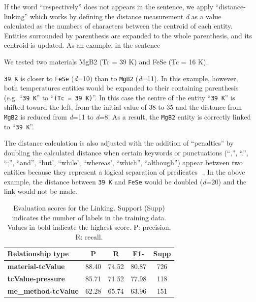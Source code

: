 
If the word ``respectively'' does not appears in the sentence, we apply ``distance-linking'' which works by defining the distance measurement \textit{d} as a value calculated as the numbers of characters between the centroid of each entity.
Entities surrounded by parenthesis are expanded to the whole parenthesis, and its centroid is updated.
As an example, in the sentence
\begin{displayquote}
    We tested two materials MgB2 (Tc = 39 K) and FeSe (Tc = 16 K).
\end{displayquote}

\texttt{39 K} is closer to \texttt{FeSe} (\textit{d}=10) than to \texttt{MgB2} (\textit{d}=11). 
In this example, however, both temperatures entities would be expanded to their containing parenthesis (e.g. ``\texttt{39 K}'' to ``\texttt{(Tc = 39 K)}''. 
In this case the centre of the entity ``\texttt{39 K}'' is shifted toward the left, from the initial value of 38 to 35 and the distance from \texttt{MgB2} is reduced from \textit{d}=11 to \textit{d}=8.
As a result, the \texttt{MgB2} entity is correctly linked to ``\texttt{39 K}''.

The distance calculation is also adjusted with the addition of ``penalties'' by doubling the calculated distance when certain keywords or punctuations (``,'', ``.'', ``;'', ``and'', ``but', ``while', ``whereas', ``which'', ``although'') appear between two entities because they represent a logical separation of predicates ~\cite{oka2021table}.
In the above example, the distance between \texttt{39 K} and \texttt{FeSe} would be doubled (\textit{d}=20) and the link would not be made.


\begin{table}[ht]
    \centering
    \caption{Evaluation scores for the Linking. Support (Supp) indicates the number of labels in the training data. Values in bold indicate the highest score. P: precision, R: recall.}
    \begin{tabular}{lcccc}
        \toprule
        \textbf{Relationship type}          & \textbf{P} & \textbf{R} & \textbf{F1-} & Supp \\
        \midrule
        \textbf{material-tcValue}   & 88.40              & 74.52           & 80.87             & 726     \\
        \textbf{tcValue-pressure}   & 85.71              & 71.52           & 77.98             & 118     \\
        \textbf{me\_method-tcValue} & 62.28              & 65.74           & 63.96             & 151     \\
        \bottomrule
    \end{tabular}

    \label{table:evaluation-linking}
\end{table}


